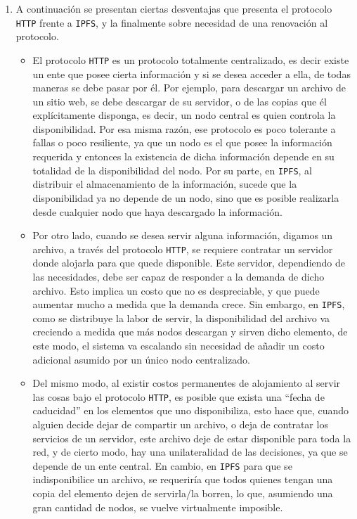 \documentclass[letterpaper,10pt]{article}
\begin{document}
\begin{enumerate}
\item A continuación se presentan ciertas desventajas que presenta el protocolo \texttt{HTTP} frente a \texttt{IPFS}, y la finalmente sobre necesidad de una renovación al protocolo.

\begin{itemize}
\item El protocolo \texttt{HTTP} es un protocolo totalmente centralizado, es decir existe un ente que posee cierta información y si se desea acceder a ella, de todas maneras se debe pasar por él. Por ejemplo, para descargar un archivo de un sitio web, se debe descargar de su servidor, o de las copias que él explícitamente disponga, es decir, un nodo central es quien controla la disponibilidad. Por esa misma razón, ese protocolo es poco tolerante a fallas o poco resiliente, ya que un nodo es el que posee la información requerida y entonces la existencia de dicha información depende en su totalidad de la disponibilidad del nodo. Por su parte, en \texttt{IPFS}, al distribuir el almacenamiento de la información, sucede que la disponibilidad ya no depende de un nodo, sino que es posible realizarla desde cualquier nodo que haya descargado la información. 

\item Por otro lado, cuando se desea servir alguna información, digamos un archivo, a través del protocolo \texttt{HTTP}, se requiere contratar un servidor donde alojarla para que quede disponible. Este servidor, dependiendo de las necesidades, debe ser capaz de responder a la demanda de dicho archivo. Esto implica un costo que no es despreciable, y que puede aumentar mucho a medida que la demanda crece. Sin embargo, en \texttt{IPFS}, como se distribuye la labor de servir, la disponibilidad del archivo va creciendo a medida que más nodos descargan y sirven dicho elemento, de este modo, el sistema va escalando sin necesidad de añadir un costo adicional asumido por un único nodo centralizado.

\item Del mismo modo, al existir costos permanentes de alojamiento al servir las cosas bajo el protocolo \texttt{HTTP}, es posible que exista una “fecha de caducidad” en los elementos que uno disponibiliza, esto hace que, cuando alguien decide dejar de compartir un archivo, o deja de contratar los servicios de un servidor, este archivo deje de estar disponible para toda la red, y de cierto modo, hay una unilateralidad de las decisiones, ya que se depende de un ente central. En cambio, en \texttt{IPFS} para que se indisponibilice un archivo, se requeriría que todos quienes tengan una copia del elemento dejen de servirla/la borren, lo que, asumiendo una gran cantidad de nodos, se vuelve virtualmente imposible.


\end{itemize}
\end{enumerate}
\end{document}
